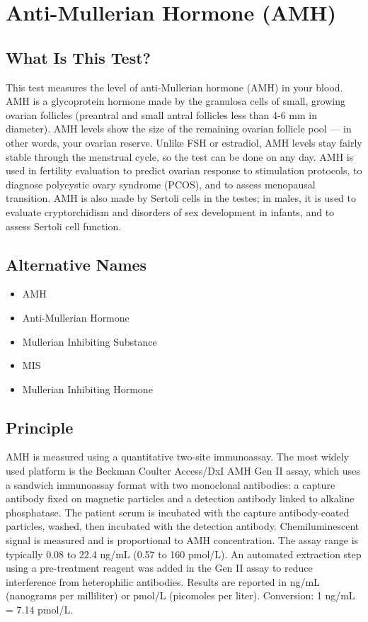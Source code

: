 \chapter{Anti-Mullerian Hormone (AMH)}

\section*{What Is This Test?}
This test measures the level of anti-Mullerian hormone (AMH) in your blood. AMH is a glycoprotein hormone made by the granulosa cells of small, growing ovarian follicles (preantral and small antral follicles less than 4-6 mm in diameter). AMH levels show the size of the remaining ovarian follicle pool --- in other words, your ovarian reserve. Unlike FSH or estradiol, AMH levels stay fairly stable through the menstrual cycle, so the test can be done on any day. AMH is used in fertility evaluation to predict ovarian response to stimulation protocols, to diagnose polycystic ovary syndrome (PCOS), and to assess menopausal transition. AMH is also made by Sertoli cells in the testes; in males, it is used to evaluate cryptorchidism and disorders of sex development in infants, and to assess Sertoli cell function.

\section*{Alternative Names}
\begin{itemize}
  \item AMH
  \item Anti-Mullerian Hormone
  \item Mullerian Inhibiting Substance
  \item MIS
  \item Mullerian Inhibiting Hormone
\end{itemize}
\section*{Principle}
AMH is measured using a quantitative two-site immunoassay. The most widely used platform is the Beckman Coulter Access/DxI AMH Gen II assay, which uses a sandwich immunoassay format with two monoclonal antibodies: a capture antibody fixed on magnetic particles and a detection antibody linked to alkaline phosphatase. The patient serum is incubated with the capture antibody-coated particles, washed, then incubated with the detection antibody. Chemiluminescent signal is measured and is proportional to AMH concentration. The assay range is typically 0.08 to 22.4 ng/mL (0.57 to 160 pmol/L). An automated extraction step using a pre-treatment reagent was added in the Gen II assay to reduce interference from heterophilic antibodies. Results are reported in ng/mL (nanograms per milliliter) or pmol/L (picomoles per liter). Conversion: 1 ng/mL = 7.14 pmol/L.

